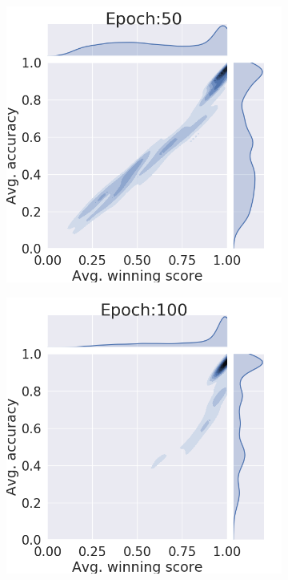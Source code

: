 \begin{figure}[htb]
\begin{subfigure}[b]{0.19\textwidth}
         \noindent\includegraphics[width=\textwidth]{images/joint_plot/no_mixup/50.png}
         \caption{}
     \end{subfigure}
     \hfill
     \begin{subfigure}[b]{0.19\textwidth}
         \centering
         \noindent\includegraphics[width=\textwidth]{images/joint_plot/no_mixup/100.png}

\end{subfigure}
\end{figure}
